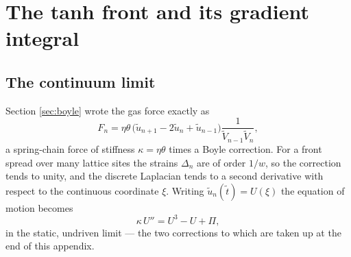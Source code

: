 %
%
%
%

\section{The tanh front and its gradient integral}
\label{app:tanh}

\subsection*{The continuum limit}

Section \ref{sec:boyle} wrote the gas force exactly as
%
\begin{equation}
  F_n = \eta\theta \,\bigl(\tilde u_{n+1} - 2\tilde u_n + \tilde u_{n-1}\bigr)
        \frac{1}{\tilde V_{n-1}\tilde V_n},
\end{equation}
%
a spring-chain force of stiffness $\kappa = \eta\theta$ times a Boyle correction.
For a front spread over many lattice sites the strains $\Delta_n$ are of order
$1/w$, so the correction tends to unity, and the discrete Laplacian tends to a
second derivative with respect to the continuous coordinate $\xi$. Writing
$\tilde u_n(\tilde t) = U(\xi)$ the equation of motion becomes
%
\begin{equation}
  \kappa\,U'' = U^3 - U + \Pi,
  \label{eq:static-kink}
\end{equation}
%
in the static, undriven limit --- the two corrections to which are taken up at
the end of this appendix.

